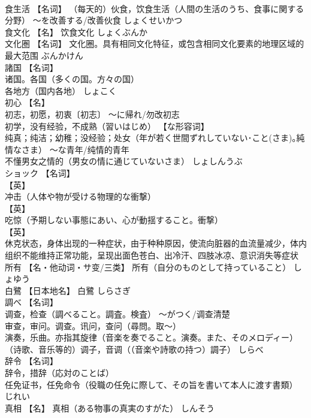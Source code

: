 \documentclass[8pt]{extreport}
\begin{document}
\begin{CJK}{UTF8}{min}
\\	食生活	【名词】 （每天的）伙食，饮食生活（人間の生活のうち、食事に関する分野） ～を改善する/改善伙食	しょくせいかつ	
\\	食文化	【名】 饮食文化	しょくぶんか	
\\	文化圏	【名词】 文化圈。具有相同文化特征，或包含相同文化要素的地理区域的最大范围	ぶんかけん	
\\	諸国	【名词】 
\\	诸国。各国（多くの国。方々の国） 
\\	各地方（国内各地）	しょこく	
\\	初心	【名】 
\\	初志，初愿，初衷〔初志〕 ～に帰れ/勿改初志 
\\	初学，没有经验，不成熟（習いはじめ） 【な形容词】 
\\	纯真；纯洁；幼稚；没经验；处女（年が若く世間ずれしていない･こと(さま)｡純情なさま） ～な青年/纯情的青年 
\\	不懂男女之情的（男女の情に通じていないさま）	しょしんうぶ	
\\	ショック	【名词】 
\\	【英】
\\	冲击（人体や物が受ける物理的な衝撃） 
\\	【英】
\\	吃惊（予期しない事態にあい、心が動揺すること。衝撃） 
\\	【英】
\\	休克状态，身体出现的一种症状，由于种种原因，使流向脏器的血流量减少，体内组织不能维持正常功能，呈现出面色苍白、出冷汗、四肢冰凉、意识消失等症状		
\\	所有	【名・他动词・サ变/三类】 所有（自分のものとして持っていること）	しょゆう	
\\	白鷺	【日本地名】 白鷺	しらさぎ	
\\	調べ	【名词】 
\\	调查，检查（調べること。調査。検査） ～がつく/调查清楚 
\\	审查，审问。调查。讯问，查问（尋問。取～） 
\\	演奏，乐曲。亦指其旋律（音楽を奏でること。演奏。また、そのメロディー） 
\\	（诗歌、音乐等的）调子，音调（（音楽や詩歌の持つ）調子）	しらべ	
\\	辞令	【名词】 
\\	辞令，措辞（応対のことば） 
\\	任免证书，任免命令（役職の任免に際して、その旨を書いて本人に渡す書類）	じれい	
\\	真相	【名】 真相（ある物事の真実のすがた）	しんそう	

\end{CJK}
\end{document}
